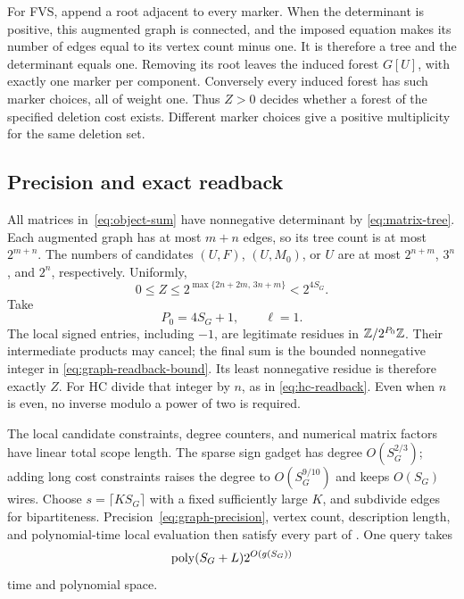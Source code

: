 For FVS, append a root adjacent to every marker. When the determinant
is positive, this augmented graph is connected, and the imposed equation
makes its number of edges equal to its vertex count minus one. It is
therefore a tree and the determinant equals one. Removing its root
leaves the induced forest $G[U]$, with exactly one marker per component.
Conversely every induced forest has such marker choices, all of weight
one. Thus $Z>0$ decides whether a forest of the specified deletion
cost exists. Different marker choices give a positive multiplicity
for the same deletion set.

\subsection{Precision and exact readback}

All matrices in~\eqref{eq:object-sum} have nonnegative determinant by
\eqref{eq:matrix-tree}. Each augmented graph has at most $m+n$ edges,
so its tree count is at most $2^{m+n}$. The numbers of candidates
$(U,F)$, $(U,M_0)$, or $U$ are at most $2^{n+m}$, $3^n$, and $2^n$,
respectively. Uniformly,
\begin{equation}\label{eq:graph-readback-bound}
 0\le Z\le2^{\max\{2n+2m,\,3n+m\}}<2^{4S_G}.
\end{equation}
Take
\begin{equation}\label{eq:graph-precision}
 P_0=4S_G+1,\qquad \ell=1.
\end{equation}
The local signed entries, including $-1$, are legitimate residues in
$\mathbb Z/2^{P_0}\mathbb Z$. Their intermediate products may cancel; the final
sum is the bounded nonnegative integer in
\eqref{eq:graph-readback-bound}. Its least nonnegative residue is
therefore exactly $Z$. For HC divide that integer by $n$, as in
\eqref{eq:hc-readback}. Even when $n$ is even, no inverse modulo a
power of two is required.

The local candidate constraints, degree counters, and numerical
matrix factors have linear total scope length. The sparse sign gadget
has degree $O(S_G^{2/3})$; adding long cost constraints raises the
degree to $O(S_G^{9/10})$ and keeps $O(S_G)$ wires. Choose
$s=\lceil K S_G\rceil$ with a fixed sufficiently large $K$, and
subdivide edges for bipartiteness. Precision~\eqref{eq:graph-precision},
vertex count, description length, and polynomial-time local evaluation
then satisfy every part of \HTC. One query takes
\begin{equation}\label{eq:one-graph-query}
 \operatorname{poly}(S_G+L)2^{O(g(S_G))}
\end{equation}
time and polynomial space.


